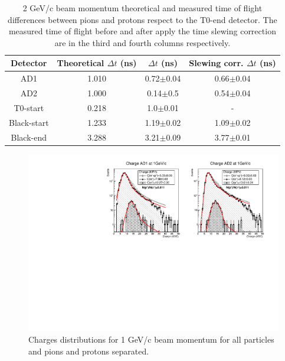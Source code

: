 	\begin{table}[h!]
	\centering
	\begin{tabular}{|c||c c c|} \hline
		\textbf{Detector} &Theoretical $\Delta t$ (ns) &$\Delta t$ (ns) &Slewing corr. $\Delta t$ (ns) \\ \hline\hline
		
		AD1	    &1.010	&0.72$\pm$0.04	&0.66$\pm$0.04	\\
		AD2	    &1.000	&0.14$\pm$0.5	&0.54$\pm$0.04	\\
		T0-start      &0.218	&1.0$\pm$0.01	&-		\\
		Black-start   &1.233	&1.19$\pm$0.02	&1.09$\pm$0.02	\\
		Black-end     &3.288	&3.21$\pm$0.09	&3.77$\pm$0.01\\ \hline
		\hline
	\end{tabular}
	\caption{2 GeV/c beam momentum theoretical and measured time of flight differences between pions and protons respect
		to the T0-end detector. The measured time of flight before and
		after apply the time slewing correction are in the third  and fourth columns respectively.}
	\label{table:2GeVtimes}
	\end{table}
	
	\begin{figure}[h!]
	  \begin{center}
	\includegraphics[scale=0.70]{./images/time/1GeV/NoteQ.pdf}%
	\caption{Charges distributions for 1 GeV/c beam momentum for all particles and pions and protons separated.}
	\label{figure:Q_1GeV}
	  \end{center}
	\end{figure}
	

